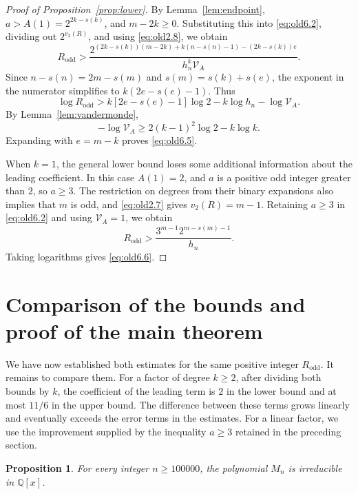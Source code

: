 \documentclass[11pt,a4paper]{article}
\numberwithin{equation}{section}
\newtheorem{proposition}[theorem]{Proposition}
\theoremstyle{definition}
\begin{document}
\begin{proof}[Proof of Proposition~\ref{prop:lower}]
By Lemma~\ref{lem:endpoint}, \(a>A(1)=2^{2k-s(k)}\), and \(m-2k\ge0\). Substituting this into \eqref{eq:old6.2}, dividing out \(2^{v_2(R)}\), and using \eqref{eq:old2.8}, we obtain
\[
R_{\mathrm{odd}}>
\frac{2^{(2k-s(k))(m-2k)+k(n-s(n)-1)-(2k-s(k))e}}
     {h_n^k\mathcal V_A}.
\]
Since \(n-s(n)=2m-s(m)\) and \(s(m)=s(k)+s(e)\), the exponent in the numerator simplifies to \(k(2e-s(e)-1)\). Thus
\begin{equation}
\log R_{\mathrm{odd}}
>k[2e-s(e)-1]\log2-k\log h_n-\log\mathcal V_A.
\label{eq:old6.3}
\end{equation}
By Lemma~\ref{lem:vandermonde},
\[
-\log\mathcal V_A\ge2(k-1)^2\log2-k\log k.
\]
Expanding with \(e=m-k\) proves \eqref{eq:old6.5}.

When \(k=1\), the general lower bound loses some additional information about the leading coefficient. In this case \(A(1)=2\), and \(a\) is a positive odd integer greater than \(2\), so \(a\ge3\). The restriction on degrees from their binary expansions also implies that \(m\) is odd, and \eqref{eq:old2.7} gives \(v_2(R)=m-1\). Retaining \(a\ge3\) in \eqref{eq:old6.2} and using \(\mathcal V_A=1\), we obtain
\[
R_{\mathrm{odd}}>
\frac{3^{m-1}2^{m-s(m)-1}}{h_n}.
\]
Taking logarithms gives \eqref{eq:old6.6}.
\end{proof}

\section{Comparison of the bounds and proof of the main theorem}\label{sec:conclusion}

We have now established both estimates for the same positive integer \(R_{\mathrm{odd}}\). It remains to compare them. For a factor of degree \(k\ge2\), after dividing both bounds by \(k\), the coefficient of the leading term is \(2\) in the lower bound and at most \(11/6\) in the upper bound. The difference between these terms grows linearly and eventually exceeds the error terms in the estimates. For a linear factor, we use the improvement supplied by the inequality \(a\ge3\) retained in the preceding section.

\begin{proposition}\label{prop:asymptotic}
For every integer \(n\ge100000\), the polynomial \(M_n\) is irreducible in \(\mathbb Q[x]\).
\end{proposition}
\end{document}

